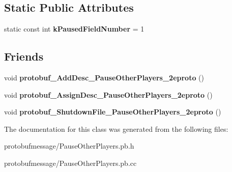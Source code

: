 \subsection*{Static Public Attributes}
\begin{DoxyCompactItemize}
\item 
\hypertarget{class_pause_other_players_ad4f24b6f71dae8934ab680c37f72b144}{static const int {\bfseries k\-Paused\-Field\-Number} = 1}\label{class_pause_other_players_ad4f24b6f71dae8934ab680c37f72b144}

\end{DoxyCompactItemize}
\subsection*{Friends}
\begin{DoxyCompactItemize}
\item 
\hypertarget{class_pause_other_players_a007eaba79d9840bfe722146d0e1d6b37}{void {\bfseries protobuf\-\_\-\-Add\-Desc\-\_\-\-Pause\-Other\-Players\-\_\-2eproto} ()}\label{class_pause_other_players_a007eaba79d9840bfe722146d0e1d6b37}

\item 
\hypertarget{class_pause_other_players_aeb3f974c8db10b61825844f19af2809a}{void {\bfseries protobuf\-\_\-\-Assign\-Desc\-\_\-\-Pause\-Other\-Players\-\_\-2eproto} ()}\label{class_pause_other_players_aeb3f974c8db10b61825844f19af2809a}

\item 
\hypertarget{class_pause_other_players_a0499888e4edae1a466fbed0481ae977b}{void {\bfseries protobuf\-\_\-\-Shutdown\-File\-\_\-\-Pause\-Other\-Players\-\_\-2eproto} ()}\label{class_pause_other_players_a0499888e4edae1a466fbed0481ae977b}

\end{DoxyCompactItemize}


The documentation for this class was generated from the following files\-:\begin{DoxyCompactItemize}
\item 
protobufmessage/Pause\-Other\-Players.\-pb.\-h\item 
protobufmessage/Pause\-Other\-Players.\-pb.\-cc\end{DoxyCompactItemize}
